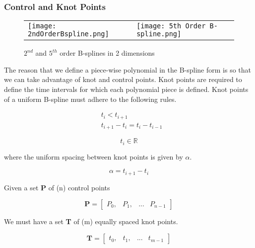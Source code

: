 \documentclass{article}
\begin{document}
\subsubsection{Control and Knot Points} \label{Control and Knot Points}

\begin{figure}[h]
\begin{tabular}{ll}
\texttt{[image: 2ndOrderBspline.png]}
&
\texttt{[image: 5th Order B-spline.png]}
\end{tabular}
\caption{$2^{nd}$ and $5^{th}$ order B-splines in 2 dimensions}
\label{Fig:Uniform B-splines}
\end{figure}

The reason that we define a piece-wise polynomial in the B-spline form is so that we can take advantage of knot and control points. Knot points are required to define the time intervals for which each polynomial piece is defined. Knot points of a uniform B-spline must adhere to the following rules.

\begin{equation}
    \begin{aligned}
        & t_i < t_{i+1} \\
        & t_{i+1} - t_i = t_{i} - t_{i-1}
    \end{aligned}
\end{equation}

\begin{equation}
    t_i \in \mathbb{R} 
\end{equation}

where the uniform spacing between knot points is given by \(\alpha\).

\begin{equation}
    \alpha = t_{i+1} - t_i
\end{equation}


Given a set \textbf{P} of (n) control points

\begin{equation}
    \textbf{P} = \begin{bmatrix} P_0, & P_1, & ... & P_{n-1} \end{bmatrix}
\end{equation}

We must have a set \textbf{T} of (m) equally spaced knot points.

\begin{equation}
    \textbf{T} = \begin{bmatrix} t_0, & t_1 , & ... & t_{m-1} \end{bmatrix}
\end{equation}
\end{document}
